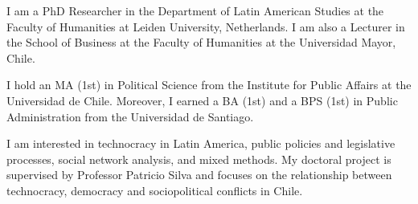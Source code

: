 




\par{I am a PhD Researcher in the Department of Latin American Studies at the Faculty of Humanities at Leiden University, Netherlands. I am also a Lecturer in the School of Business at the Faculty of Humanities at the Universidad Mayor, Chile.

I hold an MA (1st) in Political Science from the Institute for Public Affairs at the Universidad de Chile. Moreover, I earned a BA (1st) and a BPS (1st) in Public Administration from the Universidad de Santiago.

I am interested in technocracy in Latin America, public policies and legislative processes, social network analysis, and mixed methods. My doctoral project is supervised by Professor Patricio Silva and focuses on the relationship between technocracy, democracy and sociopolitical conflicts in Chile.}\\